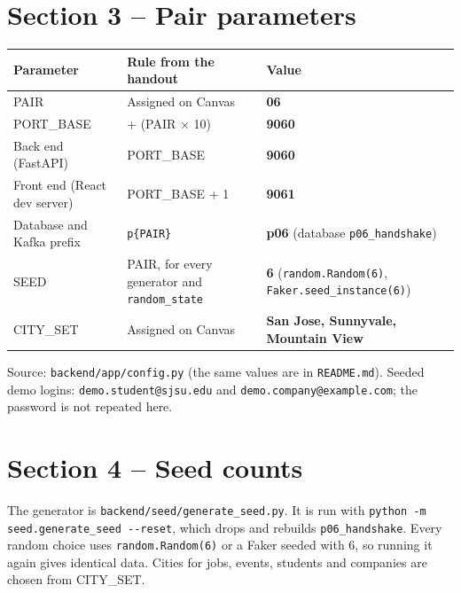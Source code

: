\documentclass[11pt,letterpaper]{article}
\newcommand{\code}[1]{\texttt{#1}}
\begin{document}
\section*{Section 3 -- Pair parameters}

{\small
\begin{longtable}{>{\raggedright\arraybackslash}p{}>{\raggedright\arraybackslash}p{}>{\raggedright\arraybackslash}p{}}
\hline
\textbf{Parameter} & \textbf{Rule from the handout} & \textbf{Value} \\ \hline
\endhead
PAIR & Assigned on Canvas & \textbf{06} \\ \hline
PORT\_BASE & 9000 + (PAIR $\times$ 10) & \textbf{9060} \\ \hline
Back end (FastAPI) & PORT\_BASE & \textbf{9060} \\ \hline
Front end (React dev server) & PORT\_BASE + 1 & \textbf{9061} \\ \hline
Database and Kafka prefix & \code{p\{PAIR\}} & \textbf{p06} (database \code{p06\_\allowbreak{}handshake}) \\ \hline
SEED & PAIR, for every generator and \code{random\_\allowbreak{}state} & \textbf{6} (\code{random.\allowbreak{}Random(6)}, \code{Faker.\allowbreak{}seed\_\allowbreak{}instance(6)}) \\ \hline
CITY\_SET & Assigned on Canvas & \textbf{San Jose, Sunnyvale, Mountain View} \\ \hline
\end{longtable}
}

Source: \code{backend/\allowbreak{}app/\allowbreak{}config.\allowbreak{}py} (the same values are in \code{README.\allowbreak{}md}). Seeded demo logins: \code{demo.\allowbreak{}student@sjsu.\allowbreak{}edu} and \code{demo.\allowbreak{}company@example.\allowbreak{}com}; the password is not repeated here.

\section*{Section 4 -- Seed counts}

The generator is \code{backend/\allowbreak{}seed/\allowbreak{}generate\_\allowbreak{}seed.\allowbreak{}py}. It is run with \code{python -\allowbreak{}m seed.\allowbreak{}generate\_\allowbreak{}seed -\allowbreak{}-\allowbreak{}reset}, which drops and rebuilds \code{p06\_\allowbreak{}handshake}. Every random choice uses \code{random.\allowbreak{}Random(6)} or a Faker seeded with 6, so running it again gives identical data. Cities for jobs, events, students and companies are chosen from CITY\_SET.
\end{document}
